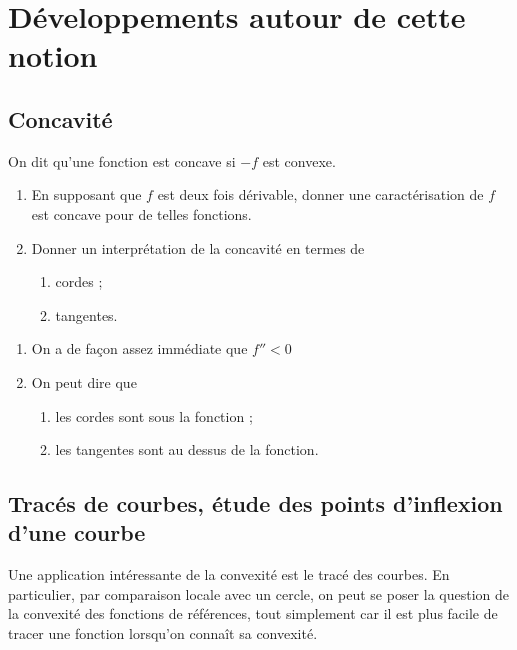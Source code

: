 \documentclass[12pt,a4paper,french]{article}
\theoremstyle{break}
\theoremstyle{plain}
\theoremstyle{nonumberplain}
\theoremstyle{nonumberbreak}
\begin{document}
\section{Développements autour de cette notion}

\subsection{Concavité}

On dit qu'une fonction est concave si $-f$ est convexe.

\begin{question}[ID=concave]
  \begin{enumerate}
    \item En supposant que $f$ est deux fois dérivable, donner une
      caractérisation de $f$ est concave pour de telles fonctions.
    \item Donner un interprétation de la concavité en termes de
      \begin{enumerate}
        \item cordes ;
        \item tangentes.
      \end{enumerate}
  \end{enumerate}
\end{question}
\begin{solution}
  \begin{enumerate}
    \item On a de façon assez immédiate que $f'' < 0$
    \item On peut dire que
      \begin{enumerate}
        \item les cordes sont sous la fonction ;
        \item les tangentes sont au dessus de la fonction.
      \end{enumerate}
  \end{enumerate}
\end{solution}

\subsection{Tracés de courbes, étude des points d'inflexion d'une
courbe}

Une application intéressante de la convexité est le tracé des courbes.
En particulier, par comparaison locale avec un cercle, on peut se poser
la question de la convexité des fonctions de références, tout simplement
car il est plus facile de tracer une fonction lorsqu'on connaît sa
convexité.
\end{document}

